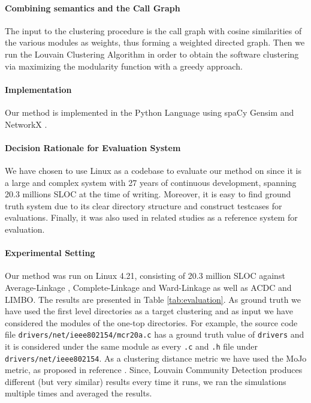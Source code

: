 \documentclass[sigconf,review, anonymous]{acmart}
\begin{document}
\paragraph{Combining semantics and the Call Graph} The input to the clustering procedure
 is the call graph with cosine similarities of the various modules as weights, thus forming a
  weighted directed graph. Then we run the Louvain Clustering Algorithm \cite{louvain} in
   order to obtain the software clustering via maximizing the modularity function with a
    greedy approach. 
    

\paragraph{Implementation}  Our method is implemented in the Python Language using spaCy\cite{spacy} Gensim \cite{gensim} and NetworkX \cite{nx}.


\paragraph{Decision Rationale for Evaluation System} We have chosen to use Linux as a codebase to evaluate our method on since it is a large and complex system with 27 years of continuous development, spanning 20.3 millions SLOC at the time of writing.  Moreover, it is easy to find ground truth system due to its clear directory structure and construct testcases for
evaluations. Finally, it was also used in related studies \cite{acdc, evaluation} as a reference system for evaluation. 

\paragraph{Experimental Setting} Our method was run on Linux 4.21,
 consisting of 20.3 million SLOC against Average-Linkage \cite{average}, Complete-Linkage \cite{complete} and Ward-Linkage \cite{ward} as well as ACDC and LIMBO. The results are presented in Table \ref{tab:evaluation}. As ground truth we have used the first level directories as a target clustering and as input we have considered the modules of the one-top directories. For example, the source code file \texttt{drivers/net/ieee802154/mcr20a.c} has a ground truth value of \texttt{drivers} and it is considered under the same module as every \texttt{.c} and \texttt{.h} file under \texttt{drivers/net/ieee802154}. As a clustering distance metric we have used the MoJo metric, as proposed in reference \cite{mojo}. Since, Louvain Community Detection produces 
 different (but very similar) results every time it runs, we ran the simulations multiple times and averaged the results. 
\end{document}
